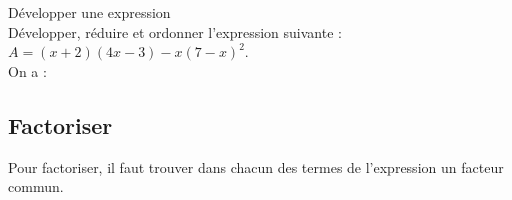 \begin{Méthode}Développer une expression\\
Développer, réduire et ordonner l'expression suivante : 
$A=(x+2)(4x-3)-x(7-x)^2$. \\
On a : \ligne

\ligne

\ligne

\ligne

\ligne

\end{Méthode}

\newpage

\subsection{Factoriser}

\noindent Pour factoriser, il faut trouver dans chacun des termes de l'expression un {\textcolor{Couleur8}{facteur commun}}.


